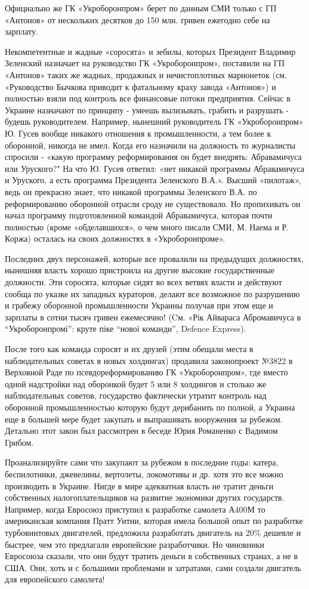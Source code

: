 Официально же ГК «Укроборонпром» берет по данным СМИ только с ГП «Антонов» от
нескольких десятков до 150 млн. гривен ежегодно себе на зарплату.

Некомпетентные и жадные «соросята» и зебилы, которых Президент Владимир
Зеленский назначает на руководство ГК «Укроборонпром», поставили на ГП
«Антонов» таких же жадных, продажных и нечистоплотных марионеток (см.
«Руководство Бычкова приводит к фатальному краху завода «Антонов») и полностью
взяли под контроль все финансовые потоки предприятия. Сейчас в Украине
назначают по принципу - умеешь вылизывать, грабить и разрушать - будешь
руководителем. Например, нынешний руководитель ГК «Укроборонпром» Ю. Гусев
вообще никакого отношения к промышленности, а тем более к оборонной, никогда не
имел. Когда его назначили на должность то журналисты спросили - «какую
программу реформирования он будет внедрять: Абравамичуса или Уруского?" На что
Ю. Гусев ответил: «нет никакой программы Абравамичуса и Уруского, а есть
программа Президента Зеленского В.А.». Высший «пилотаж», ведь он прекрасно
знает, что никакой программы Зеленского В.А. по реформированию оборонной
отрасли сроду не существовало. Но пропихивать он начал программу подготовленной
командой Абравамичуса, которая почти полностью (кроме «обделавшихся», о чем
много писали СМИ, М. Наема и Р. Коржа) осталась на своих должностях в
«Укроборонпроме».

Последних двух персонажей, которые все провалили на предыдущих должностях,
нынешняя власть хорошо пристроила на другие высокие государственные должности.
Эти соросята, которые сидят во всех ветвях власти и действуют сообща по указке
их западных кураторов, делают все возможное по разрушению и грабежу оборонной
промышленности Украины получая при этом еще и зарплаты в сотни тысяч гривен
ежемесячно! (Cм. «Рік Айвараса Абромавичуса в \enquote{Укроборонпромі}: круте піке
\enquote{нової команди}, Defence Express).

После того как команда соросят и их друзей (этим обещали места в наблюдательных
советах в новых холдингах) продавила законопроект №3822 в Верховной Раде по
псевдореформированию ГК «Укроборонпром», где вместо одной надстройки над
оборонкой будет 5 или 8 холдингов и столько же наблюдательных советов,
государство фактически утратит контроль над оборонной промышленностью которую
будут дерибанить по полной, а Украина еще в большей мере будет закупать и
выпрашивать вооружения за рубежом. Детально этот закон был рассмотрен в беседе
Юрия Романенко с Вадимом Грибом. 

Проанализируйте сами что закупают за рубежом в последние годы: катера,
беспилотники, джевелины, вертолеты, локомотивы и др. хотя это все можно
производить в Украине. Нигде в мире адекватная власть не тратит деньги
собственных налогоплательщиков на развитие экономики других государств.
Например, когда Евросоюз приступил к разработке самолета А400М то американская
компания Пратт Уитни, которая имела большой опыт по разработке турбовинтовых
двигателей, предложила разработать двигатель на 20\% дешевле и быстрее, чем это
предлагали европейские разработчики. Но чиновники Евросоюза сказали, что они
будут тратить деньги в собственных странах, а не в США. Они, хоть и с большими
проблемами и затратами, сами создали двигатель для европейского самолета!

